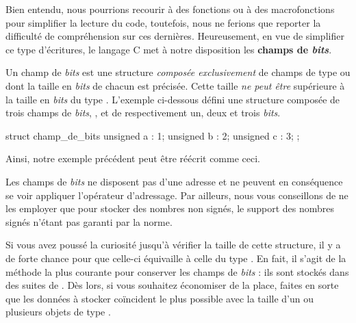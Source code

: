 \begin{infobox}
Bien entendu, nous pourrions recourir à des fonctions ou à des
macrofonctions pour simplifier la lecture du code, toutefois, nous ne
ferions que reporter la difficulté de compréhension sur ces dernières.
Heureusement, en vue de simplifier ce type d'écritures, le langage C met
à notre disposition les \textbf{champs de \emph{bits}}.

Un champ de \emph{bits} est une structure \emph{composée exclusivement}
de champs de type  ou  dont la taille
en \emph{bits} de chacun est précisée. Cette taille \emph{ne peut être}
supérieure à la taille en \emph{bits} du type . L'exemple
ci-dessous défini une structure composée de trois champs de \emph{bits},
,  et  de respectivement un, deux et trois
\emph{bits}.

\begin{C}
struct champ_de_bits
{
    unsigned a : 1;
    unsigned b : 2;
    unsigned c : 3;
};
\end{C}

Ainsi, notre exemple précédent peut être réécrit comme ceci.


\begin{erreurbox}
  Les champs de \emph{bits} ne disposent pas
d'une adresse et ne peuvent en conséquence se voir appliquer l'opérateur
d'adressage. Par ailleurs, nous vous conseillons de ne les employer que
pour stocker des nombres non signés, le support des nombres signés
n'étant pas garanti par la norme.
\end{erreurbox}


Si vous avez poussé la curiosité jusqu'à vérifier la taille de cette
structure, il y a de forte chance pour que celle-ci équivaille à celle
du type . En fait, il s'agit de la méthode la plus courante
pour conserver les champs de \emph{bits} : ils sont stockés dans des
suites de . Dès lors, si vous souhaitez économiser de la
place, faites en sorte que les données à stocker coïncident le plus
possible avec la taille d'un ou plusieurs objets de type .


\end{infobox}
